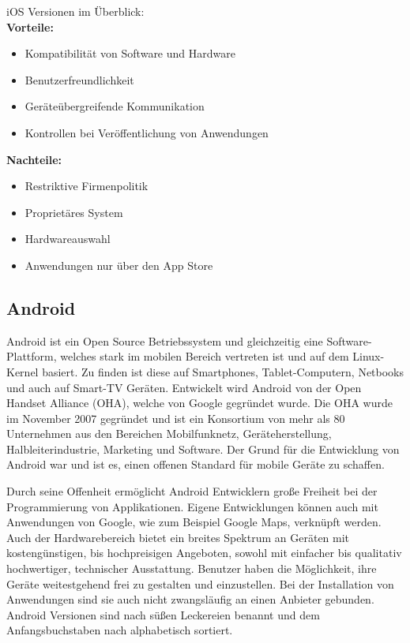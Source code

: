 iOS Versionen im Überblick:
\\

\textbf{Vorteile:}
\begin{itemize}
	\item Kompatibilität von Software und Hardware
	\item Benutzerfreundlichkeit
	\item Geräteübergreifende Kommunikation
	\item Kontrollen bei Veröffentlichung von Anwendungen
\end{itemize}

\textbf{Nachteile:}
\begin{itemize}
	\item Restriktive Firmenpolitik
	\item Proprietäres System
	\item Hardwareauswahl
	\item Anwendungen nur über den App Store
\end{itemize}




\subsection{Android}
Android ist ein Open Source Betriebssystem und gleichzeitig eine Software-Plattform, welches stark im mobilen Bereich vertreten ist und auf dem Linux-Kernel basiert. Zu finden ist diese auf Smartphones, Tablet-Computern, Netbooks und auch auf Smart-TV Geräten. Entwickelt wird Android von der Open Handset Alliance (OHA), welche von Google gegründet wurde. Die OHA wurde im November 2007 gegründet und ist ein Konsortium von mehr als 80 Unternehmen aus den Bereichen Mobilfunknetz, Geräteherstellung, Halbleiterindustrie, Marketing und Software. Der Grund für die Entwicklung von Android war und ist es, einen offenen Standard für mobile Geräte zu schaffen.

Durch seine Offenheit ermöglicht Android Entwicklern große Freiheit bei der Programmierung von Applikationen. Eigene Entwicklungen können auch mit Anwendungen von Google, wie zum Beispiel Google Maps, verknüpft werden.
Auch der Hardwarebereich bietet ein breites Spektrum an Geräten mit kostengünstigen, bis hochpreisigen Angeboten, sowohl mit einfacher bis qualitativ hochwertiger, technischer Ausstattung. Benutzer haben die Möglichkeit, ihre Geräte weitestgehend frei zu gestalten und einzustellen. Bei der Installation von Anwendungen sind sie auch nicht zwangsläufig an einen Anbieter gebunden.
Android Versionen sind nach süßen Leckereien benannt und dem Anfangsbuchstaben nach alphabetisch sortiert.
\\

